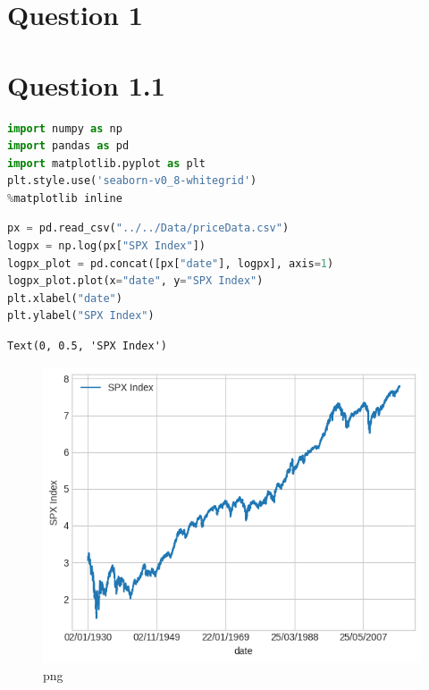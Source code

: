 \hypertarget{question-1}{%
\section{Question 1}\label{question-1}}

\hypertarget{question-1.1}{%
\section{Question 1.1}\label{question-1.1}}

\begin{lstlisting}[language=Python]
import numpy as np 
import pandas as pd 
import matplotlib.pyplot as plt 
plt.style.use('seaborn-v0_8-whitegrid')
%matplotlib inline
\end{lstlisting}

\begin{lstlisting}[language=Python]
px = pd.read_csv("../../Data/priceData.csv")
logpx = np.log(px["SPX Index"])
logpx_plot = pd.concat([px["date"], logpx], axis=1)
logpx_plot.plot(x="date", y="SPX Index")
plt.xlabel("date")
plt.ylabel("SPX Index")
\end{lstlisting}

\begin{lstlisting}
Text(0, 0.5, 'SPX Index')
\end{lstlisting}

\begin{figure}
\centering
\includegraphics{ProcessingStockPriceData_files/ProcessingStockPriceData_3_1.png}
\caption{png}
\end{figure}

